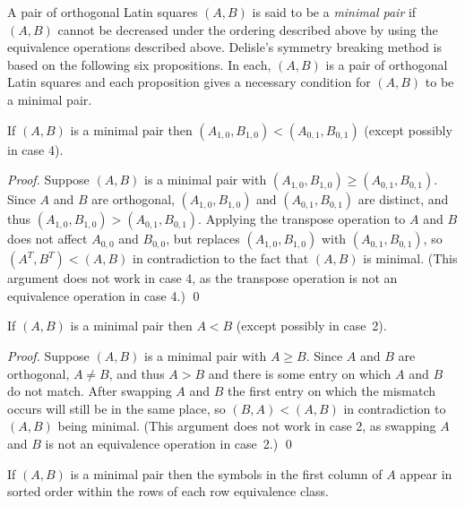 \documentclass[runningheads]{llncs}
\begin{document}
A pair of orthogonal Latin squares $(A,B)$ is said to
be a \emph{minimal pair} if $(A,B)$
cannot be decreased under the ordering described above by using the
equivalence operations described above.
Delisle's symmetry breaking method is based on the following six propositions.
In each, $(A,B)$ is a pair of orthogonal Latin squares and each proposition
gives a necessary condition for $(A,B)$ to be a minimal pair.

\begin{proposition}\label{prop:min-trans}
If $(A,B)$ is a minimal pair then $(A_{1,0},B_{1,0})<(A_{0,1},B_{0,1})$ (except possibly in case 4).
\end{proposition}

\begin{proof}
Suppose $(A,B)$ is a minimal pair with $(A_{1,0},B_{1,0})\geq(A_{0,1},B_{0,1})$.
Since $A$ and $B$ are orthogonal, $(A_{1,0},B_{1,0})$ and $(A_{0,1},B_{0,1})$ are distinct,
and thus $(A_{1,0},B_{1,0})>(A_{0,1},B_{0,1})$.  Applying the transpose operation to
$A$ and $B$ does not affect $A_{0,0}$ and $B_{0,0}$, but replaces $(A_{1,0},B_{1,0})$
with $(A_{0,1},B_{0,1})$, so $(A^T,B^T)<(A,B)$ in contradiction to the fact that
$(A,B)$ is minimal.  (This argument does not work in
case 4, as the transpose operation is not an equivalence operation in case 4.) \qed
\end{proof}

\begin{proposition}\label{prop:min-swap}
If $(A,B)$ is a minimal pair then $A<B$ (except possibly in case~2).
\end{proposition}

\begin{proof}
Suppose $(A,B)$ is a minimal pair with $A\geq B$.  Since $A$ and $B$ are orthogonal,
$A\neq B$, and thus $A>B$ and there is some entry on which $A$ and $B$ do not match.
After swapping $A$ and $B$ the first entry
on which the mismatch occurs will still be in the same place, so $(B,A)<(A,B)$
in contradiction to $(A,B)$ being minimal.
(This argument does not work in case 2, as swapping $A$ and $B$ is not an equivalence
operation in case~2.) \qed
\end{proof}

\begin{proposition}\label{prop:sort-col}
If $(A,B)$ is a minimal pair then the
symbols in the first column of\/ $A$ appear in sorted order within the rows of each row equivalence class.
\end{proposition}
\end{document}

